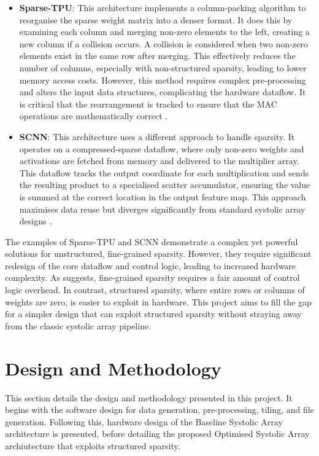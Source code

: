 \documentclass[12pt, a4paper, ukenglish]{article}
\begin{document}
        \begin{itemize}
            \item \textbf{Sparse-TPU}: This architecture implements a column-packing algorithm to reorganise the sparse weight matrix into a denser format. It does this by examining each column and merging non-zero elements to the left, creating a new column if a collision occurs. A collision is considered when two non-zero elements exist in the same row after merging. This effectively reduces the number of columns, especially with non-structured sparsity, leading to lower memory access costs. However, this method requires complex pre-processing and alters the input data structures, complicating the hardware dataflow. It is critical that the rearrangement is tracked to ensure that the MAC operations are mathematically correct \cite{he_sparse-tpu_2020}. 
            \item \textbf{SCNN}: This architecture uses a different approach to handle sparsity. It operates on a compressed-sparse dataflow, where only non-zero weights and activations are fetched from memory and delivered to the multiplier array. This dataflow tracks the output coordinate for each multiplication and sends the resulting product to a specialised scatter accumulator, ensuring the value is summed at the correct location in the output feature map. This approach maximises data reuse but diverges significantly from standard systolic array designs \cite{parashar_scnn_2017}.
        \end{itemize}
    
        The examples of Sparse-TPU and SCNN demonstrate a complex yet powerful solutions for unstructured, fine-grained sparsity. However, they require significant redesign of the core dataflow and control logic, leading to increased hardware complexity. As \textcite{palacios_systolic_2025} suggests, fine-grained sparsity requires a fair amount of control logic overhead. In contrast, structured sparsity, where entire rows or columns of weights are zero, is easier to exploit in hardware. This project aims to fill the gap for a simpler design that can exploit structured sparsity without straying away from the classic systolic array pipeline.


\section{Design and Methodology} \label{sec: design_method}
    This section details the design and methodology presented in this project. It begins with the software design for data generation, pre-processing, tiling, and file generation. Following this, hardware design of the Baseline Systolic Array architecture is presented, before detailing the proposed Optimised Systolic Array archiutecture that exploits structured sparsity. 
\end{document}
